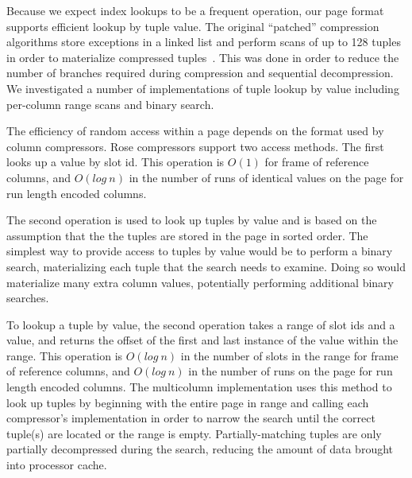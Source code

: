 \documentclass{vldb}
\newcommand{\rows}{Rose\xspace}
\newcommand{\xxx}[1]{\textcolor{red}{\bf XXX: #1}}
\renewcommand{\xxx}[1]{\xspace}
\begin{document}
Because we expect index lookups to be a frequent operation, our
page format supports efficient lookup by tuple value.  The original
``patched'' compression algorithms store exceptions in a linked list
and perform scans of up to 128 tuples in order to materialize compressed
tuples~\cite{pfor}.  This was done in order to reduce the number of branches
required during compression and sequential decompression.  We
investigated a number of implementations of tuple lookup by value
including per-column range scans and binary search.  \xxx{need data here}

The efficiency of random access within a
page depends on the format used by column compressors.  \rows
compressors support two access methods.  The first looks up a value by
slot id.  This operation is $O(1)$ for frame of reference columns, and
$O(log~n)$ in the number of runs of identical values on the page for
run length encoded columns.

The second operation is used to look up tuples by value and is based
on the assumption that the the tuples are stored in the
page in sorted order.  The simplest way to provide access to tuples by
value would be to perform a binary search, materializing each tuple
that the search needs to examine.  Doing so would materialize many
extra column values, potentially performing additional binary searches.

To lookup a tuple by value, the second operation takes a range of slot
ids and a value, and returns the offset of the first and last instance
of the value within the range.  This operation is $O(log~n)$ in the
number of slots in the range for frame of reference columns, and
$O(log~n)$ in the number of runs on the page for run length encoded
columns.  The multicolumn implementation uses this method to look up
tuples by beginning with the entire page in range and calling each
compressor's implementation in order to narrow the search until the
correct tuple(s) are located or the range is empty.
Partially-matching tuples are only partially decompressed during the
search, reducing the amount of data brought into processor cache.
\end{document}
